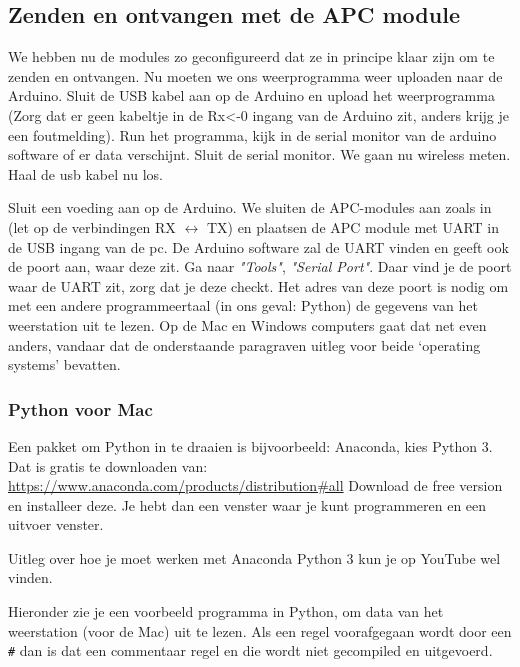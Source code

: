 \subsection{Zenden en ontvangen met de APC module}

We hebben nu de modules zo geconfigureerd dat ze in principe klaar zijn
om te zenden en ontvangen. Nu moeten we ons weerprogramma weer uploaden
naar de Arduino. Sluit de USB kabel aan op de Arduino en upload het
weerprogramma (Zorg dat er geen kabeltje in de Rx<-0 ingang van de Arduino zit,
anders krijg je een foutmelding). Run het programma, kijk in de serial monitor van de
arduino software of er data verschijnt. Sluit de serial monitor. We gaan
nu wireless meten. Haal de usb kabel nu los.

Sluit een voeding aan op de Arduino.
We sluiten de APC-modules aan zoals in  (let op de
verbindingen RX $\longleftrightarrow$ TX) en plaatsen de APC module met UART
in de USB ingang van de pc. De Arduino software zal de UART vinden en
geeft ook de poort aan, waar deze zit. Ga naar \emph {"Tools"},
\emph{"Serial Port"}. Daar vind je de poort waar de UART zit, zorg dat je deze checkt.
Het adres van deze poort is nodig om met een andere programmeertaal (in ons
geval: Python) de gegevens van het weerstation uit te lezen.
Op de Mac en Windows computers gaat dat net even anders, vandaar dat de onderstaande
paragraven uitleg voor beide `operating systems' bevatten.

\subsubsection{Python voor Mac}
Een pakket om Python in te draaien is bijvoorbeeld: Anaconda, kies Python 3.
Dat is gratis te downloaden van: \url{https://www.anaconda.com/products/distribution#all}
Download de free version en installeer deze. Je hebt dan een venster waar je kunt
programmeren en een uitvoer venster.

Uitleg over hoe je moet werken met Anaconda Python 3 kun je op YouTube wel vinden.

Hieronder zie je een voorbeeld programma in Python, om data van het weerstation
(voor de Mac) uit te lezen.
Als een regel voorafgegaan wordt door een \verb|#| dan is dat een commentaar
regel en die wordt niet gecompiled en uitgevoerd.

